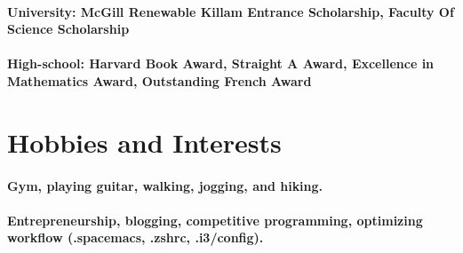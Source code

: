 \documentclass{article}
\begin{document}
\paragraph{University: McGill Renewable Killam Entrance Scholarship, Faculty Of Science Scholarship}

\paragraph{High-school: Harvard Book Award, Straight A Award, Excellence in
  Mathematics Award, Outstanding French Award}


% 

\section{Hobbies and Interests}

\paragraph{Gym, playing guitar, walking, jogging, and hiking.}

\paragraph{Entrepreneurship, blogging, competitive programming, optimizing workflow (.spacemacs, .zshrc, .i3/config).}



% 

\end{document}
